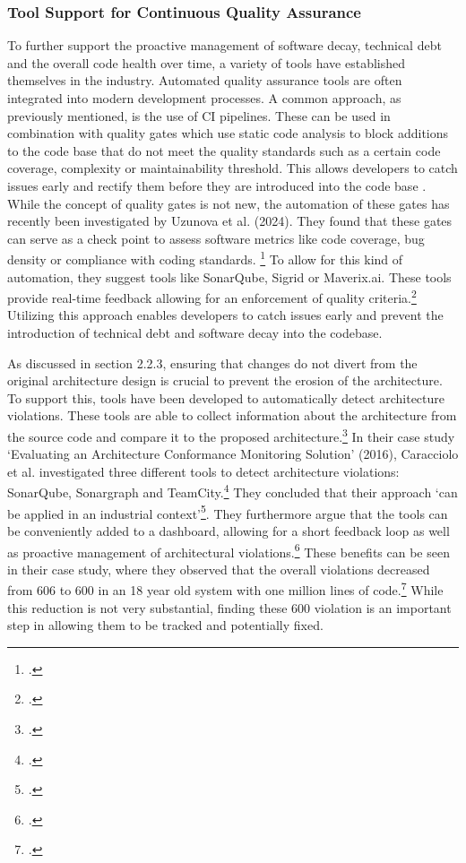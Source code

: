 \subsubsection{Tool Support for Continuous Quality Assurance}
To further support the proactive management of software decay, technical debt and the overall code health over time, a variety of tools have established themselves in the industry.
Automated quality assurance tools are often integrated into modern development processes. A common approach, as previously mentioned, is the use of \ac{CI} pipelines. These can be used in combination with quality gates which use static code analysis to block additions to the code base that do not meet the quality standards such as a 
certain code coverage, complexity or maintainability threshold. This allows developers to catch issues early and rectify them before they are introduced into the code base . While the concept of quality gates is not new, the automation of these gates has recently been investigated by Uzunova et al. (2024).
They found that these gates can serve as a check point to assess software metrics like code coverage, bug density or compliance with coding standards. \footcite[8]{uzunovaQualityGatesSoftware2024}
To allow for this kind of automation, they suggest tools like SonarQube, Sigrid or Maverix.ai. These tools provide real-time feedback allowing for an enforcement of quality criteria.\footcite[8]{uzunovaQualityGatesSoftware2024}
Utilizing this approach enables developers to catch issues early and prevent the introduction of technical debt and software decay into the codebase.

As discussed in section 2.2.3, ensuring that changes do not divert from the original architecture design is crucial to prevent the erosion of the architecture.
To support this, tools have been developed to automatically detect architecture violations. These tools are able to collect information about the architecture from the source code
and compare it to the proposed architecture.\footcite[6]{thomasStaticDynamicArchitecture2017} In their case study 
`Evaluating an Architecture Conformance Monitoring Solution' (2016), Caracciolo et al. investigated three different tools to detect architecture violations:
SonarQube, Sonargraph and TeamCity.\footcite[43]{caraccioloEvaluatingArchitectureConformance2016} They concluded that their approach 
`can be applied in an industrial context'\footcite[44]{caraccioloEvaluatingArchitectureConformance2016}.
They furthermore argue that the tools can be conveniently added to a dashboard, allowing for a short feedback loop as well as proactive management of architectural violations.\footcite[44]{caraccioloEvaluatingArchitectureConformance2016}
These benefits can be seen in their case study, where they observed that the overall violations decreased from 606 to 600 in an 18 year old system with one million lines of code.\footcite[43]{caraccioloEvaluatingArchitectureConformance2016}
While this reduction is not very substantial, finding these 600 violation is an important step in allowing them to be tracked and potentially fixed.

